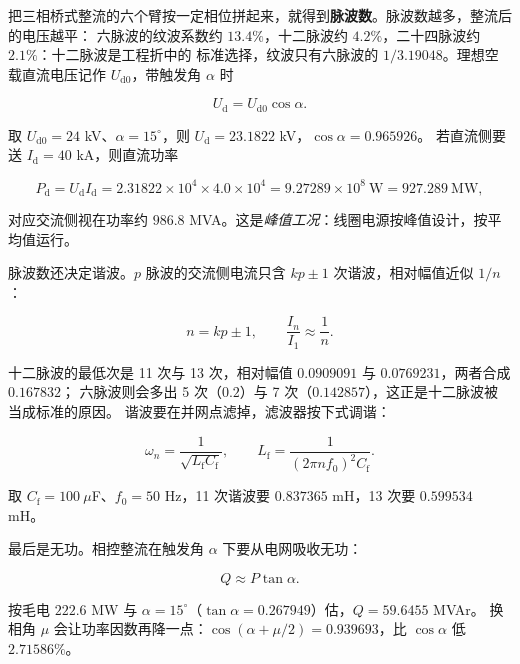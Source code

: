 把三相桥式整流的六个臂按一定相位拼起来，就得到\textbf{脉波数}。脉波数越多，整流后的电压越平：
六脉波的纹波系数约 $13.4\%$，十二脉波约 $4.2\%$，二十四脉波约 $2.1\%$：十二脉波是工程折中的
标准选择，纹波只有六脉波的 $1/3.19048$。理想空载直流电压记作 $U_\mathrm{d0}$，带触发角
$\alpha$ 时

\begin{equation}
U_\mathrm{d}=U_\mathrm{d0}\cos\alpha .
\label{eq:app-ar-ud}
\end{equation}

取 $U_\mathrm{d0}=24$ kV、$\alpha=15^\circ$，则 $U_\mathrm{d}=23.1822$ kV，$\cos\alpha=0.965926$。
若直流侧要送 $I_\mathrm{d}=40$ kA，则直流功率

\begin{equation}
P_\mathrm{d}=U_\mathrm{d}I_\mathrm{d}=2.31822\times10^{4}\times4.0\times10^{4}
=9.27289\times10^{8}\ \mathrm{W}=927.289\ \mathrm{MW},
\label{eq:app-ar-pd}
\end{equation}

对应交流侧视在功率约 $986.8$ MVA。这是\emph{峰值工况}：线圈电源按峰值设计，按平均值运行。

脉波数还决定谐波。$p$ 脉波的交流侧电流只含 $kp\pm1$ 次谐波，相对幅值近似 $1/n$：

\begin{equation}
n=kp\pm1,\qquad \frac{I_n}{I_1}\approx\frac{1}{n}.
\label{eq:app-ar-harm}
\end{equation}

十二脉波的最低次是 11 次与 13 次，相对幅值 $0.0909091$ 与 $0.0769231$，两者合成 $0.167832$；
六脉波则会多出 5 次（$0.2$）与 7 次（$0.142857$），这正是十二脉波被当成标准的原因。
谐波要在并网点滤掉，滤波器按下式调谐：

\begin{equation}
\omega_n=\frac{1}{\sqrt{L_\mathrm{f}C_\mathrm{f}}},\qquad
L_\mathrm{f}=\frac{1}{(2\pi n f_0)^2C_\mathrm{f}} .
\label{eq:app-ar-filter}
\end{equation}

取 $C_\mathrm{f}=100\ \mu$F、$f_0=50$ Hz，11 次谐波要 $0.837365$ mH，13 次要 $0.599534$ mH。

最后是无功。相控整流在触发角 $\alpha$ 下要从电网吸收无功：

\begin{equation}
Q\approx P\tan\alpha .
\label{eq:app-ar-q}
\end{equation}

按毛电 $222.6$ MW 与 $\alpha=15^\circ$（$\tan\alpha=0.267949$）估，$Q=59.6455$ MVAr。
换相角 $\mu$ 会让功率因数再降一点：$\cos(\alpha+\mu/2)=0.939693$，比 $\cos\alpha$ 低
$2.71586\%$。

